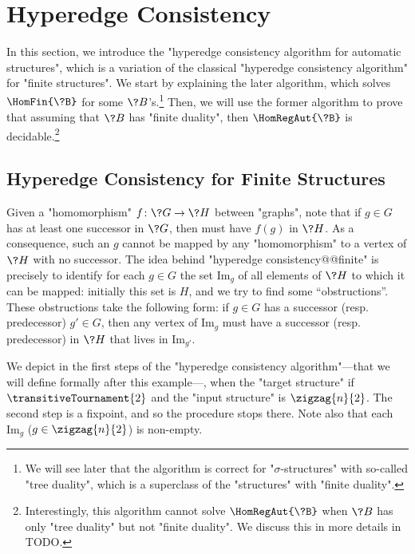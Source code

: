 \section{\AP\label{sec:hyperedge-consistency}%
	Hyperedge Consistency}

In this section, we introduce the "hyperedge consistency algorithm for automatic structures",
which is a variation of the classical "hyperedge consistency algorithm" for "finite structures".
We start by explaining the later algorithm,
which solves $\HomFin{\?B}$ for some $\?B$'s.\footnote{We will
see later that the algorithm is correct for "$\sigma$-structures" with so-called "tree duality",
which is a superclass of the "structures" with "finite duality".}
Then, we will use the former algorithm to prove that assuming that $\?B$ has "finite duality",
then $\HomRegAut{\?B}$ is decidable.\footnote{Interestingly, this algorithm cannot solve
$\HomRegAut{\?B}$ when $\?B$ has only "tree duality" but not "finite duality". 
We discuss this in more details in TODO.}

\subsection{Hyperedge Consistency for Finite Structures}

Given a "homomorphism" $f\colon \?G \to \?H$ between "graphs",
note that if $g\in G$ has at least one successor in $\?G$, then must have $f(g)$ in $\?H$.
As a consequence, such an $g$ cannot be mapped by any "homomorphism" to a vertex of $\?H$ with no
successor. The idea behind "hyperedge consistency@@finite" is precisely to identify for each
$g\in G$ the set $\textrm{Im}_g$ of all elements of $\?H$ to which it can be mapped: initially this set is $H$,
and we try to find some ``obstructions''. These obstructions take the following form:
if $g \in G$ has a successor (resp. predecessor) $g' \in G$, then any vertex of $\textrm{Im}_g$
must have a successor (resp. predecessor) in $\?H$ that lives in $\textrm{Im}_{g'}$.


\begin{example}
	\AP\label{example:zigzag-hyperedge-consistency}
	We depict in  the first steps of the "hyperedge consistency algorithm"---that we will define formally after this example---, when the "target structure"
	if $\transitiveTournament{2}$ and the "input structure" is $\zigzag{n}{2}$.
	The second step is a fixpoint, and so the procedure stops there. Note also that
	each $\textrm{Im}_g$ ($g\in \zigzag{n}{2}$) is non-empty. 
\end{example}

